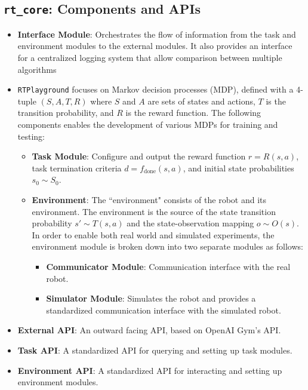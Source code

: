 \documentclass{article}
\begin{document}
\subsection{\texttt{rt\_core}: Components and APIs}

\begin{itemize}[nolistsep]
    \item \textbf{Interface Module}: Orchestrates the flow of information from the task and environment modules to the external modules. It also provides an interface for a centralized logging system that allow comparison between multiple algorithms
    \item \texttt{RTPlayground} focuses on Markov decision processes (MDP), defined with a 4-tuple $(S, A, T, R)$ where $S$ and $A$ are sets of states and actions, $T$ is the transition probability, and $R$ is the reward function. The following components enables the development of various MDPs for training and testing:
        \begin{itemize}[nolistsep]
            \item \textbf{Task Module}: Configure and output the reward function $r = R(s,a)$, task termination criteria $d = f_{\text{done}}(s,a)$, and initial state probabilities $s_0 \sim S_0$.
            \item \textbf{Environment}: The ``environment" consists of the robot and its environment. The environment is the source of the state transition probability $s' \sim T(s, a)$ and the state-observation mapping $o \sim O(s)$. In order to enable both real world and simulated experiments, the environment module is broken down into two separate modules as follows:
                \begin{itemize}[nolistsep]
                    \item \textbf{Communicator Module}: Communication interface with the real robot.
                    \item \textbf{Simulator Module}: Simulates the robot and provides a standardized communication interface with the simulated robot.
                \end{itemize}
        \end{itemize}
    \item \textbf{External API}: An outward facing API, based on OpenAI Gym's API.
    \item \textbf{Task API}: A standardized API for querying and setting up task modules.
    \item \textbf{Environment API}: A standardized API for interacting and setting up environment modules.
\end{itemize}
\end{document}
